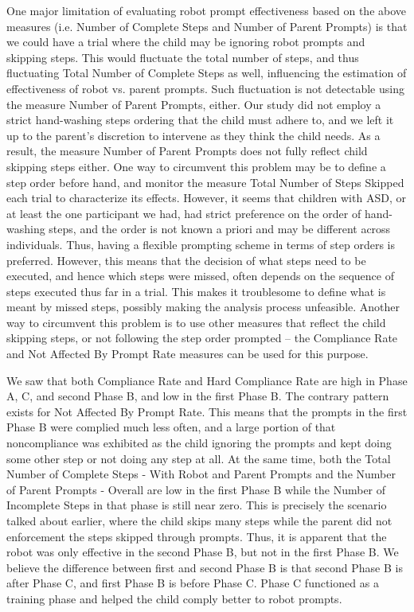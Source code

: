 One major limitation of evaluating robot prompt effectiveness based on the above measures (i.e. Number of Complete Steps and Number of Parent Prompts) is that we could have a trial where the child may be ignoring robot prompts and skipping steps.  This would fluctuate the total number of steps, and thus fluctuating Total Number of Complete Steps as well, influencing the estimation of effectiveness of robot vs. parent prompts.  Such fluctuation is not detectable using the measure Number of Parent Prompts, either.  Our study did not employ a strict hand-washing steps ordering that the child must adhere to, and we left it up to the parent's discretion to intervene as they think the child needs.  As a result, the measure Number of Parent Prompts does not fully reflect child skipping steps either.  One way to circumvent this problem may be to define a step order before hand, and monitor the measure Total Number of Steps Skipped each trial to characterize its effects.  However, it seems that children with ASD, or at least the one participant we had, had strict preference on the order of hand-washing steps, and the order is not known a priori and may be different across individuals.  Thus, having a flexible prompting scheme in terms of step orders is preferred.  However, this means that the decision of what steps need to be executed, and hence which steps were missed, often depends on the sequence of steps executed thus far in a trial.  This makes it troublesome to define what is meant by missed steps, possibly making the analysis process unfeasible.  Another way to circumvent this problem is to use other measures that reflect the child skipping steps, or not following the step order prompted -- the Compliance Rate and Not Affected By Prompt Rate measures can be used for this purpose.

We saw that both Compliance Rate and Hard Compliance Rate are high in Phase A, C, and second Phase B, and low in the first Phase B.  The contrary pattern exists for Not Affected By Prompt Rate.  This means that the prompts in the first Phase B were complied much less often, and a large portion of that noncompliance was exhibited as the child ignoring the prompts and kept doing some other step or not doing any step at all.  At the same time, both the Total Number of Complete Steps - With Robot and Parent Prompts and the Number of Parent Prompts - Overall are low in the first Phase B while the Number of Incomplete Steps in that phase is still near zero.  This is precisely the scenario talked about earlier, where the child skips many steps while the parent did not enforcement the steps skipped through prompts.  Thus, it is apparent that the robot was only effective in the second Phase B, but not in the first Phase B.  We believe the difference between first and second Phase B is that second Phase B is after Phase C, and first Phase B is before Phase C.  Phase C functioned as a training phase and helped the child comply better to robot prompts.

